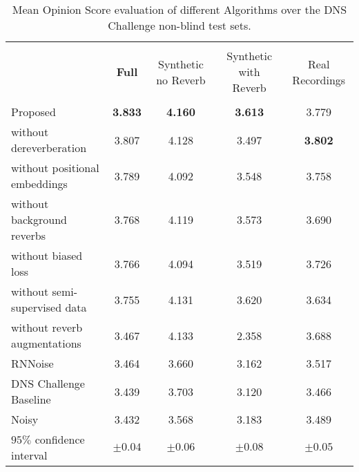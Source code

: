 \documentclass[english]{article}
\begin{document}
\begin{table*}[hbt!]
\footnotesize
\centering
\begin{tabular}{lcccc} 
\hline \\[-2ex]
$\,$& \bf{Full} & Synthetic no Reverb & Synthetic with Reverb & Real Recordings \\
\hline \\[-2ex]

Proposed & \bf{3.833} & \bf{4.160} & \bf{3.613} & 3.779 \\
\hspace{0.07in} without dereverberation & 3.807 & 4.128 & 3.497 & \bf{3.802} \\
\hspace{0.07in}  without positional embeddings & 3.789 & 4.092 & 3.548 & 3.758 \\
\hspace{0.07in}  without background reverbs & 3.768 & 4.119 & 3.573 & 3.690 \\
\hspace{0.07in}  without biased loss & 3.766 & 4.094 & 3.519 & 3.726 \\
\hspace{0.07in}  without semi-supervised data & 3.755 & 4.131 & 3.620 & 3.634 \\
\hspace{0.07in}  without reverb augmentations & 3.467 & 4.133 & 2.358 & 3.688 \\
RNNoise \cite{valin2018rnnoise} & 3.464 & 3.660 & 3.162 & 3.517 \\
DNS Challenge Baseline \cite{dnschallenge} & 3.439 & 3.703 & 3.120 & 3.466 \\
Noisy & 3.432 & 3.568 & 3.183 & 3.489\\
\hline 
$95\%$ confidence interval & $\pm 0.04$ & $\pm 0.06$ & $\pm 0.08$ & $\pm 0.05$ \\
\hline 
\end{tabular}
\vspace{0.05in}
\caption{Mean Opinion Score evaluation of different Algorithms over the DNS Challenge non-blind test sets. } 
\label{tablemos}
\end{table*}
\end{document}

